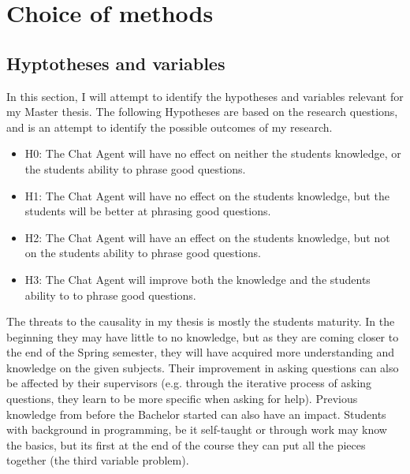 \chapter{Choice of methods}
\label{chapter4:choice_of_methods}

\section{Hyptotheses and variables}
\label{chapter4:hypotheses_variables}
In this section, I will attempt to identify the hypotheses and variables relevant for my Master thesis. The following Hypotheses are based on the research questions, 
and is an attempt to identify the possible outcomes of my research.
\begin{itemize}
	\item H0: The Chat Agent will have no effect on neither the students knowledge, 
	or the students ability to phrase good questions.
	\item H1: The Chat Agent will have no effect on the students knowledge, 
	but the students will be better at phrasing good questions.
	\item H2: The Chat Agent will have an effect on the students knowledge, 
	but not on the students ability to phrase good questions.
	\item H3: The Chat Agent will improve both the knowledge 
	and the students ability to to phrase good questions.
\end{itemize}
The threats to the causality in my thesis is mostly the students maturity. In the beginning they may have little to no knowledge, but as they are coming closer to 
the end of the Spring semester, they will have acquired more understanding and knowledge on the given subjects. Their improvement in asking questions can also be 
affected by their supervisors (e.g. through the iterative process of asking questions, they learn to be more specific when asking for help). Previous knowledge from 
before the Bachelor started can also have an impact. Students with background in programming, be it self-taught or through work may know the basics, but its first 
at the end of the course they can put all the pieces together (the third variable problem). 


